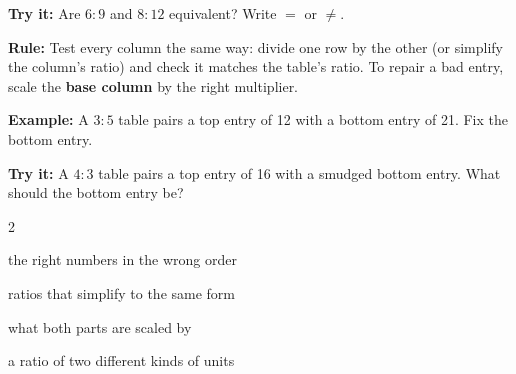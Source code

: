 \documentclass[12pt]{article}
\begin{document}
\begin{tryitbox}
\textbf{Try it:} \quad Are $6{:}9$ and $8{:}12$ equivalent? Write $=$ or
$\neq$.\\[2pt]
\end{tryitbox}


\begin{formulabox}
\textbf{Rule:} Test every column the same way: divide one row by the other (or
simplify the column's ratio) and check it matches the table's ratio. To repair a
bad entry, scale the \textbf{base column} by the right multiplier.
\end{formulabox}

\begin{examplebox}
\textbf{Example:} \quad A $3{:}5$ table pairs a top entry of 12 with a bottom
entry of 21. Fix the bottom entry.
\end{examplebox}

\begin{tryitbox}
\textbf{Try it:} \quad A $4{:}3$ table pairs a top entry of 16 with a smudged
bottom entry. What should the bottom entry be?\\[2pt]
\end{tryitbox}

\vspace{0.3cm}

\begin{multicols}{2}
\begin{description}[leftmargin=0.5cm, itemsep=2pt, font=\normalfont\bfseries]
  \item[Reversed ratio:] the right numbers in the wrong order
  \item[Equivalent ratios:] ratios that simplify to the same form
  \item[Multiplier:] what both parts are scaled by
  \item[Rate:] a ratio of two different kinds of units
\end{description}
\end{multicols}
\end{document}
